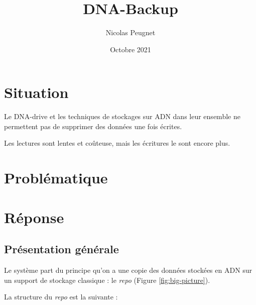 \documentclass[a4paper,twocolumn]{article}
\title{DNA-Backup}
\date{Octobre 2021}
\author{Nicolas Peugnet}
\begin{document}
\maketitle

\tableofcontents

\section{Situation}

Le DNA-drive et les techniques de stockages sur ADN dans leur ensemble ne permettent pas de supprimer des données une fois écrites.

Les lectures sont lentes et coûteuse, mais les écritures le sont encore plus.

\section{Problématique}
\section{Réponse}

\subsection{Présentation générale}


Le système part du principe qu'on a une copie des données stockées en
ADN sur un support de stockage classique : le \emph{repo} (Figure \ref{fig:big-picture}).
\smallskip

\begin{figure*}[ht]
\centering


\caption{Schéma global}
\label{fig:big-picture}
\end{figure*}

La structure du \emph{repo} est la suivante :
\smallskip
\end{document}
